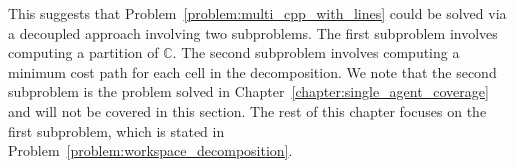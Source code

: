 \documentclass[../main.tex]{subfiles}
\begin{document}
This suggests that Problem~\ref{problem:multi_cpp_with_lines} could be solved via a decoupled approach involving two subproblems. The first subproblem involves computing a partition of $\mathbb{C}$. The second subproblem involves computing a minimum cost path for each cell in the decomposition.  We note that the second subproblem is the problem solved in Chapter~\ref{chapter:single_agent_coverage} and will not be covered in this section. The rest of this chapter focuses on the first subproblem, which is stated in Problem~\ref{problem:workspace_decomposition}.

\end{document}
